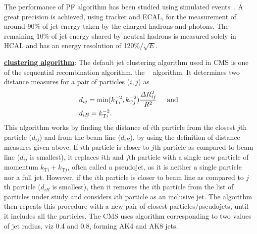 The performance of PF algorithm has been studied using simulated events~\cite{CMS-PAS-PFT-09-001}. A great precision is achieved, using tracker and ECAL,
for the measurement of around 90$\%$ of jet energy taken by the charged hadrons and photons.
The remaining 10$\%$ of jet energy shared by neutral hadrons is measured solely in HCAL and 
has an energy resolution of 120$\%/\sqrt{E}$.

\noindent
\underline{\bf{\boldmath{$\Antikt$} clustering algorithm}}:
The default jet clustering algorithm used in CMS is one of the sequential recombination algorithm, the \antikt~\cite{Cacciari:2008gp} algorithm.  
It determines two distance measures for a pair of particles ($i,j$) as
\begin{equation}
  \begin{split}
    & d_{ij} = \textrm{min}(k^{-2}_{\mathrm{T}i}, k^{-2}_{\mathrm{T}j}) \frac{\Delta{R}^{2}_{ij}}{R^{2}} \hspace{0.2in} \textrm{and}\\
    & d_{iB} = k^{-2}_{\mathrm{T}i}.
  \end{split}   
\end{equation}
This algorithm works by finding the distance of $i$th particle from the closest $j$th particle ($d_{ij}$) and from the beam line ($d_{iB}$), by using
the definition of distance measures given above. If $i$th particle is closer to $j$th particle as compared to beam line ($d_{ij}$ is smallest),
it replaces $i$th and $j$th
particle with a single new particle of momentum $k_{\mathrm{T}i}+k_{\mathrm{T}j}$, often called a pseudojet, as it is neither a single particle nor a full jet.
However, if the $i$th particle is closer to beam line as compared to $j$th particle ($d_{iB}$ is smallest), then it removes the $i$th particle from the
list of particles under study and considers $i$th particle as an inclusive jet. The
algorithm then repeats this procedure with a new pair of closest particles$/$pseudojets, until it includes all the particles. The CMS uses \antikt algorithm
corresponding to two values of jet radius, viz 0.4 and 0.8, forming AK4 and AK8 jets.
